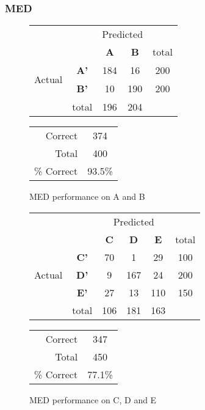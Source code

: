 \subsubsection{MED}
\begin{figure}[!ht]
\begin{minipage}[b]{0.5\linewidth}
\centering
	\begin{tabular}{ccc|c|c}
	 & &\multicolumn{2}{c}{Predicted} &\\
	  & & \bf{A} &  \bf{B} & total \\
	 \cline{3-5}
	 \multirow{2}{*}{\begin{sideways}Actual\end{sideways}} & \bf{A'}& 184 & 16 & 200 \\
	 \cline{3-5}
	 & \bf{B'}& 10 & 190 & 200 \\
	  \cline{3-5}
	 &total&196&204&\\
	\end{tabular}
\end{minipage}
\hspace{0.5cm}
\begin{minipage}[b]{0.5\linewidth}
	\begin{tabular}{r|c}
	\hline
	Correct& 374\\
	Total& 400\\
	\hline
	\% Correct& 93.5\%\\
	\hline
	\end{tabular}
\end{minipage}
\vspace{1mm}
\caption{MED performance on A and B}
\end{figure}


\begin{figure}[!ht]
\begin{minipage}[b]{0.5\linewidth}
\centering
	\begin{tabular}{ccc|c|c|c}
	 & &\multicolumn{3}{c}{Predicted} &\\
	  & & \bf{C} &  \bf{D} & \bf{E} & total \\
	 \cline{3-6}
	 \multirow{3}{*}{\begin{sideways}Actual\end{sideways}} & \bf{C'}& 70 & 1 & 29 & 100\\
	 \cline{3-6}
	 & \bf{D'}& 9 & 167 & 24 & 200\\
	  \cline{3-6}
	 & \bf{E'}& 27 & 13 & 110 &  150\\
	  \cline{3-6}
	 &total&106&181&163\\
	\end{tabular}
\end{minipage}
\hspace{0.5cm}
\begin{minipage}[b]{0.5\linewidth}
	\begin{tabular}{r|c}
	\hline
	Correct& 347\\
	Total& 450\\
	\hline
	\% Correct& 77.1\%\\
	\hline
	\end{tabular}
\end{minipage}
\vspace{1mm}
\caption{MED performance on C, D and E}
\end{figure}

